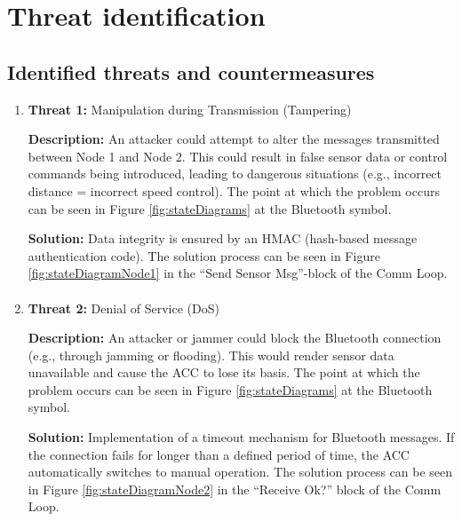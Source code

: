 \section{Threat identification}
\label{chapter5}

\subsection{Identified threats and countermeasures}


	\begin{enumerate}
		\item \textbf{Threat 1:} Manipulation during Transmission (Tampering)
            
            \textbf{Description:} An attacker could attempt to alter the messages transmitted between Node 1 and Node 2. This could result in false sensor data or control commands being introduced, leading to dangerous situations (e.g., incorrect distance = incorrect speed control). The point at which the problem occurs can be seen in Figure \ref{fig:stateDiagrams} at the Bluetooth symbol.
            
            \textbf{Solution:} Data integrity is ensured by an HMAC (hash-based message authentication code). The solution process can be seen in Figure \ref{fig:stateDiagramNode1} in the “Send Sensor Msg”-block of the Comm Loop.
        
        \paragraph{} 
		\item \textbf{Threat 2:} Denial of Service (DoS)
            
            \textbf{Description:} An attacker or jammer could block the Bluetooth connection (e.g., through jamming or flooding). This would render sensor data unavailable and cause the ACC to lose its basis. The point at which the problem occurs can be seen in Figure \ref{fig:stateDiagrams} at the Bluetooth symbol.
            
            \textbf{Solution:} Implementation of a timeout mechanism for Bluetooth messages. If the connection fails for longer than a defined period of time, the ACC automatically switches to manual operation. The solution process can be seen in Figure \ref{fig:stateDiagramNode2} in the “Receive Ok?” block of the Comm Loop.
        

\end{enumerate}
